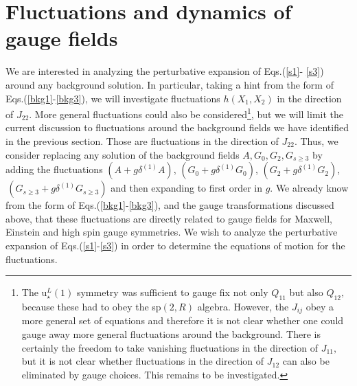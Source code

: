 \documentclass[a4paper,12pt]{article}
\begin{document}
\section{Fluctuations and dynamics of gauge fields}

We are interested in analyzing the perturbative expansion of Eqs.(\ref{s1}-%
\ref{s3}) around any background solution. In particular, taking a hint from
the form of Eqs.(\ref{bkg1}-\ref{bkg3}), we will investigate fluctuations $%
h\left( X_{1},X_{2}\right) $ in the direction of $J_{22}$. More general
fluctuations could also be considered\footnote{%
The u$_{\star }^{L}\left( 1\right) $ symmetry was sufficient to gauge fix
not only $Q_{11}$ but also $Q_{12},$ because these had to obey the sp$\left(
2,R\right) $ algebra. However, the $J_{ij}$ obey a more general set of
equations and therefore it is not clear whether one could gauge away more
general fluctuations around the background. There is certainly the freedom
to take vanishing fluctuations in the direction of $J_{11},$ but it is not
clear whether fluctuations in the direction of $J_{12}$ can also be
eliminated by gauge choices. This remains to be investigated.}, but we will
limit the current discussion to fluctuations around the background fields we
have identified in the previous section. Those are fluctuations in the
direction of $J_{22}$. Thus, we consider replacing any solution of the
background fields $A,G_{0},G_{2},G_{s\geq 3}$ by adding the fluctuations $%
\left( A+g\delta ^{\left( 1\right) }A\right) $, $\left( G_{0}+g\delta
^{\left( 1\right) }G_{0}\right) $, $\left( G_{2}+g\delta ^{\left( 1\right)
}G_{2}\right) $, $\,\left( G_{s\geq 3}+g\delta ^{\left( 1\right) }G_{s\geq
3}\right) $ and then expanding to first order in $g$. We already know from
the form of Eqs.(\ref{bkg1}-\ref{bkg3}), and the gauge transformations
discussed above, that these fluctuations are directly related to gauge
fields for Maxwell, Einstein and high spin gauge symmetries. We wish to
analyze the perturbative expansion of Eqs.(\ref{s1}-\ref{s3}) in order to
determine the equations of motion for the fluctuations.
\end{document}
